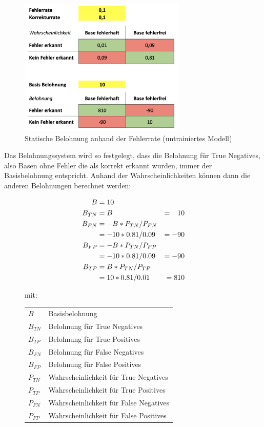 \documentclass[oneside,bibliography=totocnumbered,BCOR=5mm]{scrbook}%
\makeatletter
\theoremstyle{definition}
\theoremstyle{definition}
\theoremstyle{definition}
\theoremstyle{definition}
\theoremstyle{definition}
\theoremstyle{definition}
\newenvironment{conditions}[1][mit:]
  {#1 \begin{tabular}[t]{>{$}l<{$} @{${}={}$} l}}
  {\end{tabular}\\[\belowdisplayskip]}
\makeatother
\begin{document}
\begin{figure}[h]
  \centering
  \includegraphics[width=300px,keepaspectratio]{images/static_reward.png}
  \caption{Statische Belohnung anhand der Fehlerrate (untrainiertes Modell)}
  \label{basicRewards}
\end{figure}

Das Belohnungssystem wird so festgelegt, dass die Belohnung für True Negatives,
also Basen ohne Fehler die als korrekt erkannt wurden, immer der Basisbelohnung entspricht.
Anhand der Wahrscheinlichkeiten können dann die anderen Belohnungen berechnet werden:\\
\linebreak[4]

\begin{figure}[h]
\begin{align*}
  B &= 10 \\
  B_{TN} &= B & = \phantom{-} 10 \\
  B_{FN} &= - B * P_{TN} / P_{FN} \\
  &= -10 * 0.81 / 0.09 &= -90 \notag\\
  B_{FP} &= - B * P_{TN} / P_{FP} \\
  &= -10 * 0.81 / 0.09 &= -90 \notag\\
  B_{TP} &= B * P_{TN} / P_{TP} \\
  &= 10 * 0.81 / 0.01 &= 810 \notag\\
\end{align*} 


\begin{conditions}
  B & Basisbelohnung \\
  B_{TN} & Belohnung für True Negatives \\
  B_{TP} & Belohnung für True Positives \\
  B_{FN} & Belohnung für False Negatives \\
  B_{FP} & Belohnung für False Positives \\
  P_{TN} & Wahrscheinlichkeit für True Negatives \\
  P_{TP} & Wahrscheinlichkeit für True Positives \\
  P_{FN} & Wahrscheinlichkeit für False Negatives \\
  P_{FP} & Wahrscheinlichkeit für False Positives
\end{conditions}

\end{figure}
\leavevmode \\
\end{document}
